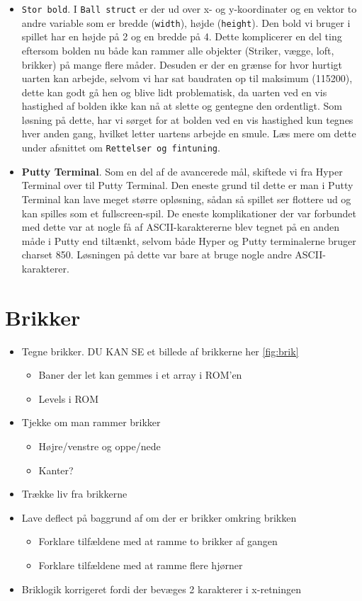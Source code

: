 \begin{itemize}
\item \texttt{Stor bold}. I \texttt{Ball struct} er der ud over x- og y-koordinater og en vektor to andre variable som er bredde (\texttt{width}), højde (\texttt{height}). Den bold vi bruger i spillet har en højde på 2 og en bredde på 4. Dette komplicerer en del ting eftersom bolden nu både kan rammer alle objekter (Striker, vægge, loft, brikker) på mange flere måder. Desuden er der en grænse for hvor hurtigt uarten kan arbejde, selvom vi har sat baudraten op til maksimum (115200), dette kan godt gå hen og blive lidt problematisk, da uarten ved en vis hastighed af bolden ikke kan nå at slette og gentegne den ordentligt. Som løsning på dette, har vi sørget for at bolden ved en vis hastighed kun tegnes hver anden gang, hvilket letter uartens arbejde en smule. Læs mere om dette under  afsnittet om \texttt{Rettelser og fintuning}.

\item \textbf{Putty Terminal}. Som en del af de avancerede mål, skiftede vi fra Hyper Terminal over til Putty Terminal. Den eneste grund til dette er man i Putty Terminal kan lave meget større opløsning, sådan så spillet ser flottere ud og kan spilles som et fullscreen-spil. De eneste komplikationer der var forbundet med dette var at nogle få af ASCII-karaktererne blev tegnet på en anden måde i Putty end tiltænkt, selvom både Hyper og Putty terminalerne bruger charset 850. Løsningen på dette var bare at bruge nogle andre ASCII-karakterer.
\end{itemize}


\section{Brikker}
\begin{itemize}
\item Tegne brikker. DU KAN SE et billede af brikkerne her \ref{fig:brik}
\begin{itemize}
\item Baner der let kan gemmes i et array i ROM'en
\item Levels i ROM
\end{itemize}
\item Tjekke om man rammer brikker
\begin{itemize}
\item Højre/venstre og oppe/nede
\item Kanter?
\end{itemize}
\item Trække liv fra brikkerne
\item Lave deflect på baggrund af om der er brikker omkring brikken
\begin{itemize}
\item Forklare tilfældene med at ramme to brikker af gangen
\item Forklare tilfældene med at ramme flere hjørner
\end{itemize}
\item Briklogik korrigeret fordi der bevæges 2 karakterer i x-retningen
\end{itemize}


